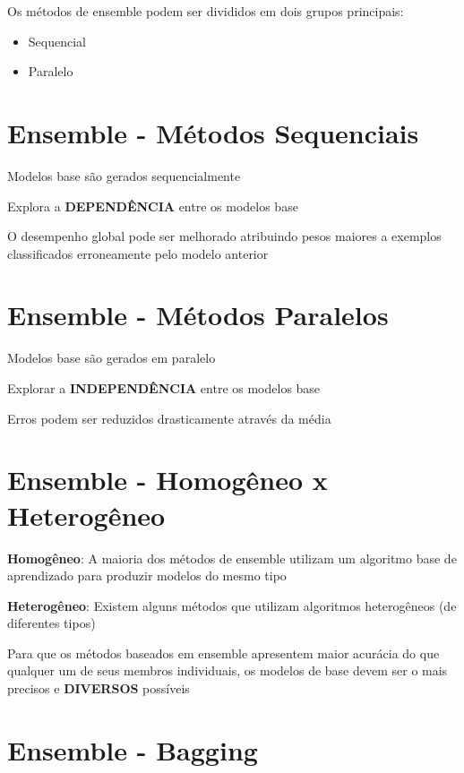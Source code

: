 \documentclass[11pt]{article}
\providecommand{\tightlist}{%
      \setlength{\itemsep}{0pt}\setlength{\parskip}{0pt}}
\begin{document}
Os métodos de ensemble podem ser divididos em dois grupos principais:

\begin{itemize}
\tightlist
\item
  Sequencial
\item
  Paralelo
\end{itemize}

    \hypertarget{ensemble---muxe9todos-sequenciais}{%
\section{Ensemble - Métodos
Sequenciais}\label{ensemble---muxe9todos-sequenciais}}

Modelos base são gerados sequencialmente

Explora a \textbf{DEPENDÊNCIA} entre os modelos base

O desempenho global pode ser melhorado atribuindo pesos maiores a
exemplos classificados erroneamente pelo modelo anterior

    \hypertarget{ensemble---muxe9todos-paralelos}{%
\section{Ensemble - Métodos
Paralelos}\label{ensemble---muxe9todos-paralelos}}

Modelos base são gerados em paralelo

Explorar a \textbf{INDEPENDÊNCIA} entre os modelos base

Erros podem ser reduzidos drasticamente através da média

    \hypertarget{ensemble---homoguxeaneo-x-heteroguxeaneo}{%
\section{Ensemble - Homogêneo x
Heterogêneo}\label{ensemble---homoguxeaneo-x-heteroguxeaneo}}

\textbf{Homogêneo}: A maioria dos métodos de ensemble utilizam um
algoritmo base de aprendizado para produzir modelos do mesmo tipo

\textbf{Heterogêneo}: Existem alguns métodos que utilizam algoritmos
heterogêneos (de diferentes tipos)

Para que os métodos baseados em ensemble apresentem maior acurácia do
que qualquer um de seus membros individuais, os modelos de base devem
ser o mais precisos e \textbf{DIVERSOS} possíveis

    \hypertarget{ensemble---bagging}{%
\section{Ensemble - Bagging}\label{ensemble---bagging}}
\end{document}
